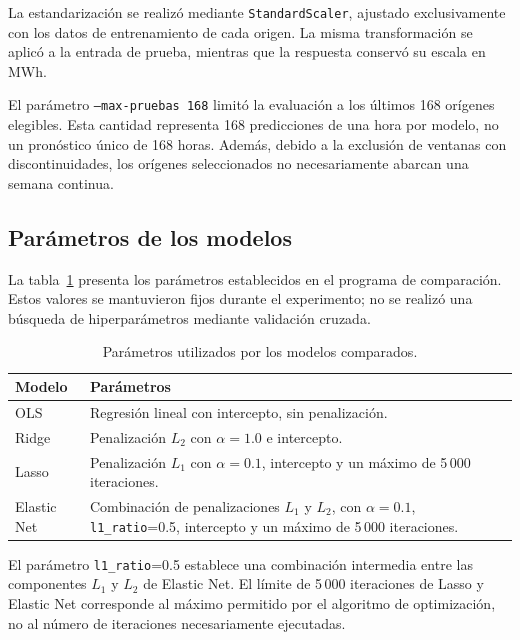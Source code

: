 La estandarización se realizó mediante \texttt{StandardScaler}, ajustado exclusivamente con los datos de entrenamiento de cada origen. La misma transformación se aplicó a la entrada de prueba, mientras que la respuesta conservó su escala en MWh.

El parámetro \texttt{--max-pruebas 168} limitó la evaluación a los últimos 168 orígenes elegibles. Esta cantidad representa 168 predicciones de una hora por modelo, no un pronóstico único de 168 horas. Además, debido a la exclusión de ventanas con discontinuidades, los orígenes seleccionados no necesariamente abarcan una semana continua.

\subsection{Parámetros de los modelos}

La tabla~\ref{tab:parametros-modelos-lineales} presenta los parámetros establecidos en el programa de comparación. Estos valores se mantuvieron fijos durante el experimento; no se realizó una búsqueda de hiperparámetros mediante validación cruzada.

\begin{table}[htbp]
    \centering
    \caption{Parámetros utilizados por los modelos comparados.}
    \label{tab:parametros-modelos-lineales}
    \begin{tabular}{p{}p{}}
        \toprule
        Modelo & Parámetros \\
        \midrule
        OLS &
        Regresión lineal con intercepto, sin penalización. \\

        Ridge &
        Penalización $L_2$ con $\alpha=1.0$ e intercepto. \\

        Lasso &
        Penalización $L_1$ con $\alpha=0.1$, intercepto y un máximo de 5\,000 iteraciones. \\

        Elastic Net &
        Combinación de penalizaciones $L_1$ y $L_2$, con
        $\alpha=0.1$, \texttt{l1\_ratio}=0.5, intercepto y un máximo de 5\,000 iteraciones. \\
        \bottomrule
    \end{tabular}
\end{table}

El parámetro \texttt{l1\_ratio}=0.5 establece una combinación intermedia entre las componentes $L_1$ y $L_2$ de Elastic Net. El límite de 5\,000 iteraciones de Lasso y Elastic Net corresponde al máximo permitido por el algoritmo de optimización, no al número de iteraciones necesariamente ejecutadas.

